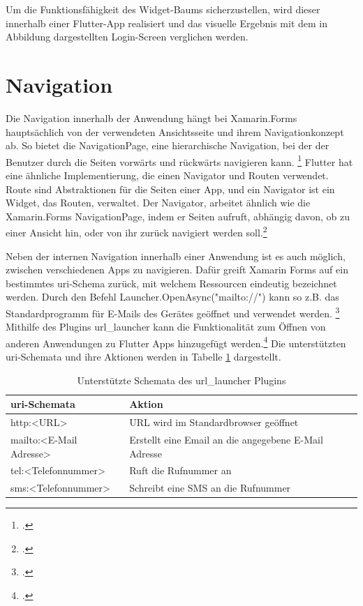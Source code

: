 Um die Funktionsfähigkeit des Widget-Baums sicherzustellen,  wird dieser innerhalb einer Flutter-App realisiert und das visuelle Ergebnis mit dem in Abbildung dargestellten Login-Screen verglichen werden. 


\section{Navigation}
\label{sec:nav}

Die Navigation innerhalb der Anwendung hängt bei Xamarin.Forms hauptsächlich von der verwendeten Ansichtsseite und ihrem Navigationkonzept ab.  So bietet die \glq NavigationPage\grq{}, eine hierarchische Navigation, bei der der Benutzer durch die Seiten vorwärts und rückwärts navigieren kann. \footcite[Vgl.][Abgerufen am \today]{MicrosoftXamNavigation2020} Flutter hat eine ähnliche Implementierung,  die einen \glq  Navigator\grq{} und \glq  Routen\grq{} verwendet.  Route sind  Abstraktionen für die Seiten einer App, und ein \glq  Navigator\grq{} ist ein Widget, das \glq Routen\grq{}, verwaltet.  Der \glq Navigator\grq{}, arbeitet ähnlich wie die Xamarin.Forms \glq NavigationPage\grq{}, indem er Seiten aufruft,  abhängig davon,  ob zu einer Ansicht hin,  oder von ihr zurück navigiert werden soll.\footcite[Vgl.][Abgerufen am \today]{GoogleFlutterNavigation2020} 


Neben der internen Navigation innerhalb einer Anwendung ist es auch möglich, zwischen verschiedenen Apps zu navigieren.  Dafür greift Xamarin Forms auf ein bestimmtes \ac{uri}-Schema zurück, mit welchem Ressourcen eindeutig bezeichnet werden.  Durch den Befehl \glq Launcher.OpenAsync("mailto://")\grq{} kann so z.B.  das Standardprogramm für E-Mails des Gerätes geöffnet und verwendet werden. \footcite[Vgl.][Abgerufen am \today]{MicrosoftLauncher2020} Mithilfe des Plugins \glq url\_launcher\grq{} kann die Funktionalität zum Öffnen von anderen Anwendungen zu Flutter Apps hinzugefügt werden.\footcite[Vgl.][Abgerufen am \today]{Googleurllauncher2020} Die unterstützten \ac{uri}-Schemata und ihre Aktionen werden in Tabelle \ref{tab:URISChema} dargestellt.

\begin{table}[!ht]
\begin{tabularx}{\textwidth}{X|X}
   \textbf{\ac{uri}-Schemata} & \textbf{Aktion}  \\
\hline
	http:<URL>		       				&  	URL wird im Standardbrowser geöffnet 		\\ 
	mailto:<E-Mail Adresse>		       		&  	Erstellt eine Email an die angegebene E-Mail Adresse 		\\ 
	tel:<Telefonnummer>	       		&  	Ruft die Rufnummer an 		\\ 
	sms:<Telefonnummer>		       		&  	Schreibt eine SMS an die Rufnummer		\\ 
\end{tabularx}
\caption{Unterstützte Schemata des \glq url\_launcher\grq{} Plugins}
 \label{tab:URISChema}
\end{table}

